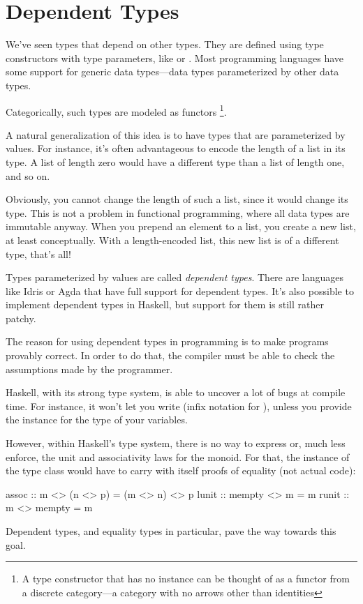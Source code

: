 \documentclass[DaoFP]{subfiles}
\begin{document}
\setcounter{chapter}{21}

\chapter{Dependent Types}

We've seen types that depend on other types. They are defined using type constructors with type parameters, like  or \hask{[]}. Most programming languages have some support for generic data types---data types parameterized by other data types.

Categorically, such types are modeled as functors \footnote{A type constructor that has no  instance can be thought of as a functor from a discrete category---a category with no arrows other than identities}.

A natural generalization of this idea is to have types that are parameterized by values. For instance, it's often advantageous to encode the length of a list in its type. A list of length zero would have a different type than a list of length one, and so on. 

Obviously, you cannot change the length of such a list, since it would change its type. This is not a problem in functional programming, where all data types are immutable anyway. When you prepend an element to a list, you create a new list, at least conceptually. With a length-encoded list, this new list is of a different type, that's all!

Types parameterized by values are called \emph{dependent types}. There are languages like Idris or Agda that have full support for dependent types. It's also possible to implement dependent types in Haskell, but support for them is still rather patchy. 

The reason for using dependent types in programming is to make programs provably correct. In order to do that, the compiler must be able to check the assumptions made by the programmer. 

Haskell, with its strong type system, is able to uncover a lot of bugs at compile time. For instance, it won't let you write  (infix notation for ), unless you provide the  instance for the type of your variables. 

However, within Haskell's type system, there is no way to express or, much less enforce, the unit and associativity laws for the monoid. For that, the instance of the  type class would have to carry with itself proofs of equality (not actual code):
\begin{haskell}
assoc :: m <> (n <> p) = (m <> n) <> p
lunit :: mempty <> m = m
runit :: m <> mempty = m
\end{haskell}
Dependent types, and equality types in particular, pave the way towards this goal.
\end{document}
